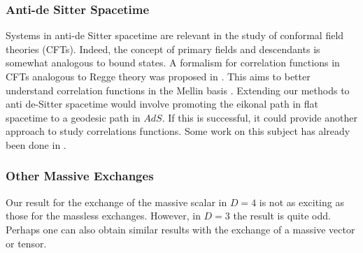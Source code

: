 \subsubsection*{Anti-de Sitter Spacetime}
Systems in anti-de Sitter spacetime are relevant in the study of conformal field theories (CFTs). Indeed, the concept of primary fields and descendants is somewhat analogous to bound states. A formalism for correlation functions in CFTs analogous to Regge theory was proposed in \cite{Costa:2012cb}. This aims to better understand correlation functions in the Mellin basis \cite{Fitzpatrick:2011ia,Paulos:2011ie}. Extending our methods to anti de-Sitter spacetime would involve promoting the eikonal path in flat spacetime to a geodesic path in $AdS$. If this is successful, it could provide another approach to study correlations functions. Some work on this subject has already been done in \cite{Brower:2007qh,Cornalba:2006xk,Cornalba:2006xm,Cornalba:2007zb,
Cornalba:2008qf,Penedones:2007ns}.
\subsubsection*{Other Massive Exchanges}
Our result for the exchange of the massive scalar in $D = 4$ is not as exciting as those for the massless exchanges. However, in $D = 3$ the result is quite odd. Perhaps one can also obtain similar results with the exchange of a massive vector or tensor.
